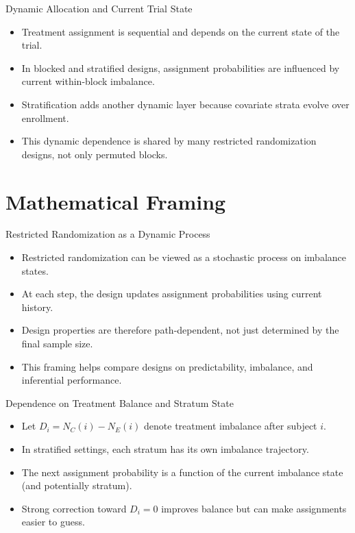 \documentclass[
  11pt,
  ignorenonframetext,
  aspectratio=169,
]{beamer}
\providecommand{\tightlist}{%
  \setlength{\itemsep}{0pt}\setlength{\parskip}{0pt}}
\begin{document}
\begin{frame}{Dynamic Allocation and Current Trial State}
\protect\hypertarget{dynamic-allocation-and-current-trial-state}{}
\begin{itemize}
\tightlist
\item
  Treatment assignment is sequential and depends on the current state of
  the trial.
\item
  In blocked and stratified designs, assignment probabilities are
  influenced by current within-block imbalance.
\item
  Stratification adds another dynamic layer because covariate strata
  evolve over enrollment.
\item
  This dynamic dependence is shared by many restricted randomization
  designs, not only permuted blocks.
\end{itemize}
\end{frame}

\hypertarget{mathematical-framing}{%
\section{Mathematical Framing}\label{mathematical-framing}}

\begin{frame}{Restricted Randomization as a Dynamic Process}
\protect\hypertarget{restricted-randomization-as-a-dynamic-process}{}
\begin{itemize}
\tightlist
\item
  Restricted randomization can be viewed as a stochastic process on
  imbalance states.
\item
  At each step, the design updates assignment probabilities using
  current history.
\item
  Design properties are therefore path-dependent, not just determined by
  the final sample size.
\item
  This framing helps compare designs on predictability, imbalance, and
  inferential performance.
\end{itemize}
\end{frame}

\begin{frame}{Dependence on Treatment Balance and Stratum State}
\protect\hypertarget{dependence-on-treatment-balance-and-stratum-state}{}
\begin{itemize}
\tightlist
\item
  Let \(D_i = N_C(i)-N_E(i)\) denote treatment imbalance after subject
  \(i\).
\item
  In stratified settings, each stratum has its own imbalance trajectory.
\item
  The next assignment probability is a function of the current imbalance
  state (and potentially stratum).
\item
  Strong correction toward \(D_i=0\) improves balance but can make
  assignments easier to guess.
\end{itemize}
\end{frame}
\end{document}
